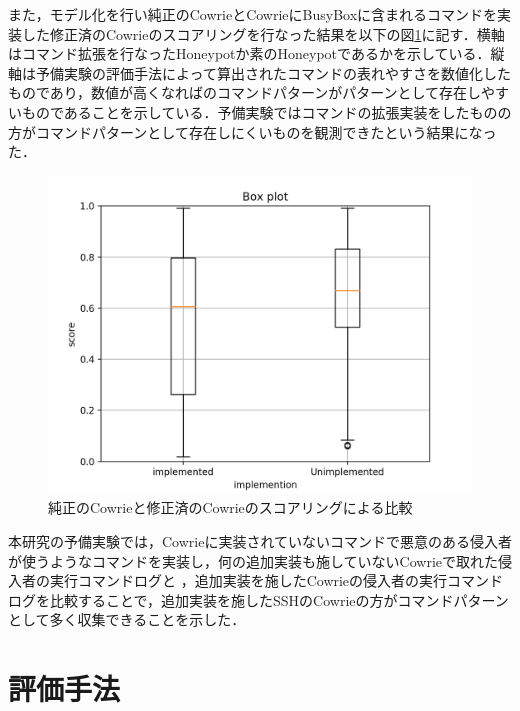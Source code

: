 
また，モデル化を行い純正のCowrieとCowrieにBusyBoxに含まれるコマンドを実装した修正済のCowrieのスコアリングを行なった結果を以下の図\ref{fig:cowriecompare}に記す．横軸はコマンド拡張を行なったHoneypotか素のHoneypotであるかを示している．縦軸は予備実験の評価手法によって算出されたコマンドの表れやすさを数値化したものであり，数値が高くなればのコマンドパターンがパターンとして存在しやすいものであることを示している．予備実験ではコマンドの拡張実装をしたものの方がコマンドパターンとして存在しにくいものを観測できたという結果になった．

\begin{figure}[htbp]
    \centering
    \includegraphics[width=1.0\textwidth]{figures/Figure_1.png}
    \caption{純正のCowrieと修正済のCowrieのスコアリングによる比較}
    \label{fig:cowriecompare}
\end{figure}

本研究の予備実験では，Cowrieに実装されていないコマンドで悪意のある侵入者が使うようなコマンドを実装し，何の追加実装も施していないCowrieで取れた侵入者の実行コマンドログと ，追加実装を施したCowrieの侵入者の実行コマンドログを比較することで，追加実装を施したSSHのCowrieの方がコマンドパターンとして多く収集できることを示した．


\section{評価手法}
\label{eval:eval}

